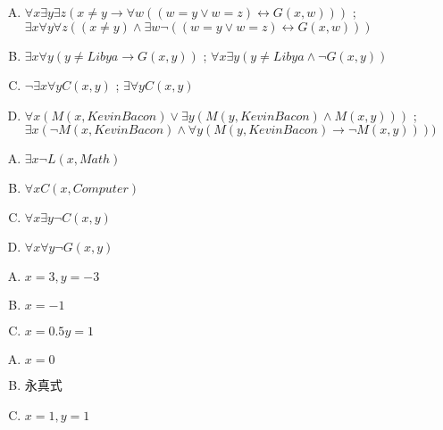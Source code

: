 {{        %
        \begin{practices}
            \begin{enumerate}[A.]
                \item $\forall x \exists y \exists z (x \neq y \rightarrow \forall w ((w = y \vee w = z) \leftrightarrow G(x, w)))$ ; $\exists x \forall y \forall z ((x \neq y) \wedge \exists w \neg ((w = y \vee w = z) \leftrightarrow G(x, w)))$
                \item $\exists x \forall y (y \neq Libya \rightarrow G(x, y))$ ; $\forall x \exists y (y \neq Libya \wedge \neg G(x, y))$
                \item $\neg \exists x \forall y C(x, y)$ ; $\exists \forall y C(x, y)$
                \item $\forall x (M(x, Kevin Bacon) \vee \exists y (M(y, Kevin Bacon) \wedge M(x, y)))$ ; $\exists x (\neg M(x, Kevin Bacon) \wedge \forall y (M(y, Kevin Bacon) \rightarrow \neg M(x, y))))$
            \end{enumerate}
        \end{practices}

        \begin{practices}
            \begin{enumerate}[A.]
                \item $\exists x \neg L(x, Math)$
                \item $\forall x C(x, Computer)$
                \item $\forall x \exists y \neg C(x, y)$
                \item $\forall x \forall y \neg G(x, y)$
            \end{enumerate}
        \end{practices}

        \begin{practices}
            \begin{enumerate}[A.]
                \item $x = 3, y = -3$
                \item $x = -1$
                \item $x = 0.5 y = 1$
            \end{enumerate}
        \end{practices}

        \begin{practices}
            \begin{enumerate}[A.]
                \item $x = 0$
                \item 永真式
                \item $x = 1, y = 1$
            \end{enumerate}
        \end{practices}

}}
